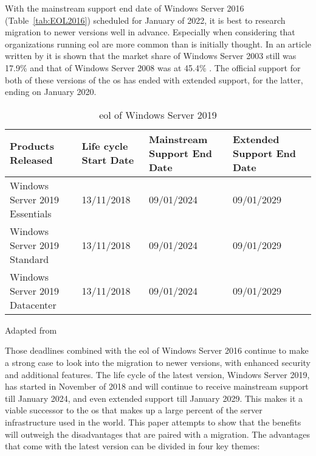 With the mainstream support end date of Windows Server 2016 (Table~\ref{tab:EOL2016}) scheduled for January of 2022, it is best to research migration to newer versions well in advance. Especially when considering that organizations running \acrfull{eol} are more common than is initially thought. In an article written by \textcite{Tsai2016} it is shown that the market share of Windows Server 2003 still was 17.9\% and that of Windows Server 2008 was at 45.4\% . The official support for both of these versions of the \acrshort{os} has ended with extended support, for the latter, ending on January 2020. 

\begin{table}[ht]
	\centering
	\begin{adjustbox}{width=1\textwidth}
		\begin{tabular}{l||l|l|l|l}
			Products Released                                                     & Life cycle Start Date & Mainstream Support End Date & Extended Support End Date &\\
			\hline
			\hline
			Windows Server 2019 Essentials                                        & 13/11/2018           & 09/01/2024                  & 09/01/2029                &\\
			Windows Server 2019 Standard                                          & 13/11/2018           & 09/01/2024                  & 09/01/2029                &\\
			Windows Server 2019 Datacenter                                        & 13/11/2018			 & 09/01/2024				   & 09/01/2029  			   &\\
		\end{tabular}
	\end{adjustbox}
	\caption{\acrshort{eol} of Windows Server 2019}
	\scriptsize	
	Adapted from \autocite{MicrosoftEOL2019}
	\label{tab:EOL2019}
\end{table}

Those deadlines combined with the \acrshort{eol} of Windows Server 2016 continue to make a strong case to look into the migration to newer versions, with enhanced security and additional features. The life cycle of the latest version, Windows Server 2019, has started in November of 2018 and will continue to receive mainstream support till January 2024, and even extended support till January 2029. This makes it a viable successor to the \acrshort{os} that makes up a large percent of the server infrastructure used in the world. This paper attempts to show that the benefits will outweigh the disadvantages that are paired with a migration. The advantages that come with the latest version can be divided in four key themes:

